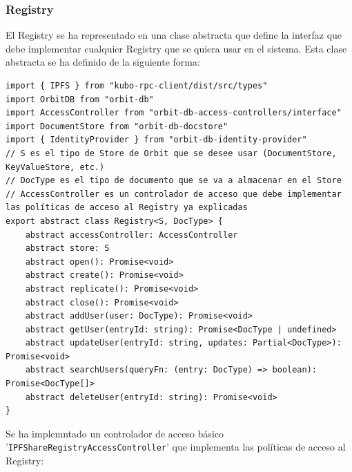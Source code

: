 \subsubsection{Registry}

El Registry se ha representado en una clase abstracta que define la interfaz que debe implementar cualquier Registry que se quiera usar en el sistema. Esta clase abstracta se ha definido de la siguiente forma:
\begin{verbatim}
import { IPFS } from "kubo-rpc-client/dist/src/types"
import OrbitDB from "orbit-db"
import AccessController from "orbit-db-access-controllers/interface"
import DocumentStore from "orbit-db-docstore"
import { IdentityProvider } from "orbit-db-identity-provider"
// S es el tipo de Store de Orbit que se desee usar (DocumentStore, KeyValueStore, etc.)
// DocType es el tipo de documento que se va a almacenar en el Store
// AccessController es un controlador de acceso que debe implementar las políticas de acceso al Registry ya explicadas
export abstract class Registry<S, DocType> {
    abstract accessController: AccessController
    abstract store: S
    abstract open(): Promise<void> 
    abstract create(): Promise<void>
    abstract replicate(): Promise<void>
    abstract close(): Promise<void>
    abstract addUser(user: DocType): Promise<void>
    abstract getUser(entryId: string): Promise<DocType | undefined>
    abstract updateUser(entryId: string, updates: Partial<DocType>): Promise<void>
    abstract searchUsers(queryFn: (entry: DocType) => boolean): Promise<DocType[]>
    abstract deleteUser(entryId: string): Promise<void>
}
\end{verbatim}
Se ha implemntado un controlador de acceso básico \\'\texttt{IPFShareRegistryAccessController}' que implementa las políticas de acceso al
Registry:

